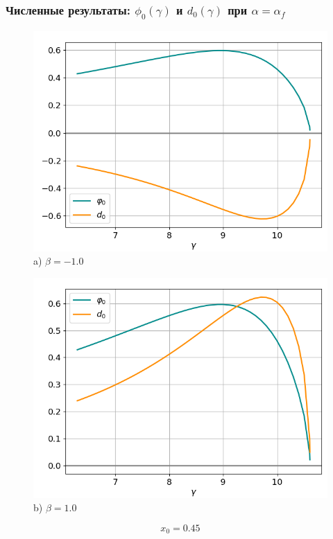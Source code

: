 \documentclass[fullscreen=true, unicode, bookmarks=false]{beamer}
\begin{document}
\begin{frame}
\frametitle{ Численные результаты: $ \phi_0(\gamma) $ и $ d_0(\gamma) $ при $ \alpha=\alpha_f $ }

\begin{figure} 
\begin{minipage}[h]{0.49\linewidth}
\begin{center}
\includegraphics[scale=0.33]{oscillating_phi0d0_after_tangent_x0_045_beta_-1.png} \\ {\scriptsize a) $ \beta = -1.0 $}
\end{center}
\end{minipage} 
\hfill
\begin{minipage}[h]{0.49\linewidth}
\begin{center}
\includegraphics[scale=0.33]{oscillating_phi0d0_after_tangent_x0_045_beta_1.png}  \\ {\scriptsize b) $ \beta = 1.0 $}
\end{center}
\end{minipage} 
\end{figure}

$$ x_0 = 0.45 $$

\end{frame}
\end{document}
